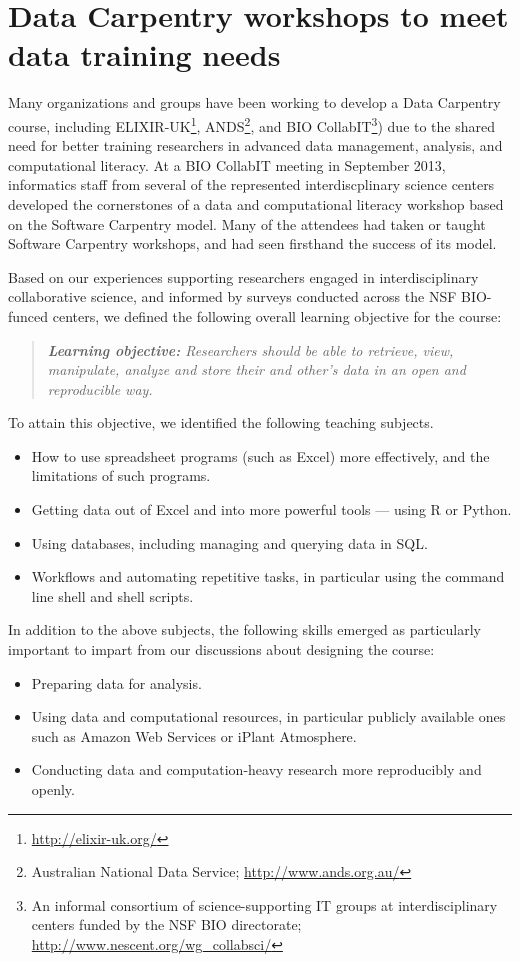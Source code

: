 \documentclass[11pt]{article}
\begin{document}
\section{Data Carpentry workshops to meet data training needs} \label{sec:dc-workshops}

Many organizations and groups have been working to develop a Data
Carpentry course, including
ELIXIR-UK\footnote{\url{http://elixir-uk.org/}},
ANDS\footnote{Australian National Data Service;
  \url{http://www.ands.org.au/}}, and BIO CollabIT\footnote{An
  informal consortium of science-supporting IT groups at
  interdisciplinary centers funded by the NSF BIO directorate;
  \url{http://www.nescent.org/wg_collabsci/}}) due to the shared need
for better training researchers in advanced data management, analysis,
and computational literacy. At a BIO CollabIT meeting in September
2013, informatics staff from several of the represented
interdiscplinary science centers developed the cornerstones of a data
and computational literacy workshop based on the Software Carpentry
model. Many of the attendees had taken or taught Software Carpentry
workshops, and had seen firsthand the success of its model.

Based on our experiences supporting researchers engaged in
interdisciplinary collaborative science, and informed by surveys
conducted across the NSF BIO-funced centers, we defined the following
overall learning objective for the course:
\begin{quote}{\emph{\textbf{Learning objective:} Researchers should be
      able to retrieve, view, manipulate, analyze and store their and
      other's data in an open and reproducible way.}}
\end{quote}

To attain this objective, we identified the following teaching subjects.
\begin{itemize}
\item How to use spreadsheet programs (such as Excel) more effectively, and the limitations of such programs.
\item Getting data out of Excel and into more powerful tools --- using R or Python.
\item Using databases, including managing and querying data in SQL.
\item Workflows and automating repetitive tasks, in particular using the command line shell and shell scripts.
\end{itemize}

In addition to the above subjects, the following skills emerged as
particularly important to impart from our discussions about designing
the course:
\begin{itemize}
\item Preparing data for analysis.
\item Using data and computational resources, in particular publicly available ones such as Amazon Web Services or iPlant Atmosphere.
\item Conducting data and computation-heavy research more reproducibly and openly.
\end{itemize}
\end{document}
